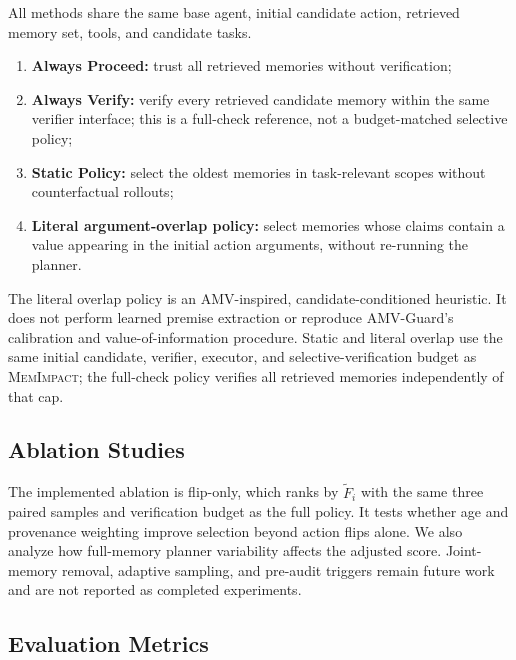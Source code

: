 \documentclass[11pt]{article}
\newcommand{\method}{\textsc{MemImpact}}
\begin{document}
All methods share the same base agent, initial candidate action, retrieved memory set, tools, and candidate tasks.
\begin{enumerate}
  \item \textbf{Always Proceed:} trust all retrieved memories without verification;
  \item \textbf{Always Verify:} verify every retrieved candidate memory within the same verifier interface; this is a full-check reference, not a budget-matched selective policy;
  \item \textbf{Static Policy:} select the oldest memories in task-relevant scopes without counterfactual rollouts;
  \item \textbf{Literal argument-overlap policy:} select memories whose claims contain a value appearing in the initial action arguments, without re-running the planner.
\end{enumerate}
The literal overlap policy is an AMV-inspired, candidate-conditioned heuristic. It does not perform learned premise extraction or reproduce AMV-Guard's calibration and value-of-information procedure. Static and literal overlap use the same initial candidate, verifier, executor, and selective-verification budget as \method; the full-check policy verifies all retrieved memories independently of that cap.

\subsection{Ablation Studies}

The implemented ablation is flip-only, which ranks by $\widetilde{F}_i$ with the same three paired samples and verification budget as the full policy. It tests whether age and provenance weighting improve selection beyond action flips alone. We also analyze how full-memory planner variability affects the adjusted score. Joint-memory removal, adaptive sampling, and pre-audit triggers remain future work and are not reported as completed experiments.

\subsection{Evaluation Metrics}
\end{document}
